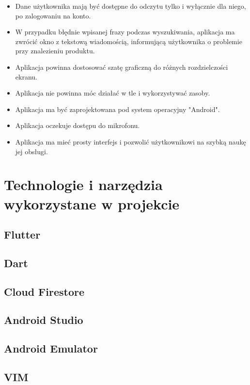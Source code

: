 \documentclass[12pt, a4paper]{article}
\begin{document}
\begin{sloppypar}
{{    \begin{itemize}
      \item Dane użytkownika mają być dostępne do odczytu tylko i wyłącznie dla niego, po 
      zalogowaniu na konto.
      \item W przypadku błędnie wpisanej frazy podczas wyszukiwania, aplikacja ma 
      zwrócić okno z tekstową wiadomością, informującą użytkownika o problemie przy
      znalezieniu produktu.
      \item Aplikacja powinna dostosować szatę graficzną do różnych rozdzielczości ekranu.
      \item Aplikacja nie powinna móc działać w tle i wykorzystywać zasoby.
      \item Aplikacja ma być zaprojektowana pod system operacyjny "Android".
      \item Aplikacja oczekuje dostępu do mikrofonu. 
      \item Aplikacja ma mieć prosty interfejs i pozwolić użytkownikowi na szybką naukę
      jej obsługi.
    \end{itemize}
  }
}

\section{Technologie i narzędzia wykorzystane w projekcie}
{
  \subsection{Flutter}
  {

  }
  \subsection{Dart}
  {

  }
  \subsection{Cloud Firestore}
  {

  }
  \subsection{Android Studio}
  {

  }
  \subsection{Android Emulator}
  {

  }
  \subsection{VIM}
  {

}}
\end{sloppypar}
\end{document}
